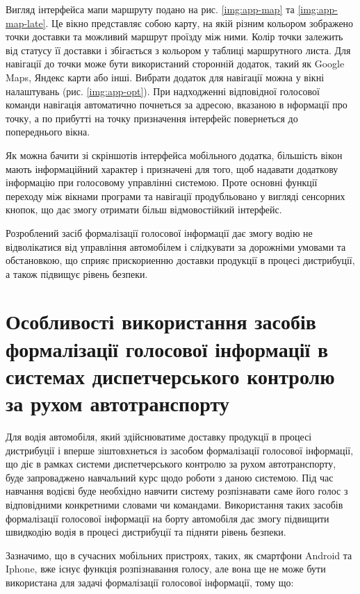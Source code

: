 Вигляд інтерфейса мапи маршруту подано на рис. \ref{img:app-map} та \ref{img:app-map-late}. Це вікно представляє собою карту, на якій різним кольором зображено точки доставки та можливий маршрут проїзду між ними. Колір точки залежить від статусу її доставки і збігається з кольором у таблиці маршрутного листа. Для навігації до точки може бути використаний сторонній додаток, такий як Google Maps, Яндекс карти або інші. Вибрати додаток для навігації можна у вікні налаштувань (рис. \ref{img:app-opt}). При надходженні відповідної голосової команди навігація автоматично почнеться за адресою, вказаною в нформації про точку, а по прибутті на точку призначення інтерфейс повернеться до попереднього вікна.

Як можна бачити зі скріншотів інтерфейса мобільного додатка, більшість вікон мають інформаційний характер і призначені для того, щоб надавати додаткову інформацію при голосовому управлінні системою. Проте основні функції переходу між вікнами програми та навігації продубльовано у вигляді сенсорних кнопок, що дає змогу отримати більш відмовостійкий інтерфейс.

Розроблений засіб формалізації голосової інформації дає змогу водію не відволікатися від управління автомобілем і слідкувати за дорожніми умовами та обстановкою, що сприяє прискориенню доставки продукції в процесі дистрибуції, а також підвищує рівень безпеки.

\section{Особливості використання засобів формалізації голосової інформації в системах диспетчерського контролю за рухом автотранспорту} \label{sect4_1}

Для водія автомобіля, який здійснюватиме доставку продукції в процесі дистрибуції і вперше зіштовхнеться із засобом формалізації голосової інформації, що діє в рамках системи диспетчерського контролю за рухом автотранспорту, буде запроваджено навчальний курс щодо роботи з даною системою. Під час навчання водієві буде необхідно навчити систему розпізнавати саме його голос з відповідними конкретними словами чи командами. Використання таких засобів формалізації голосової інформації на борту автомобіля дає змогу підвищити швидкодію водія в процесі дистрибуції та підняти рівень безпеки.

Зазначимо, що в сучасних мобільних пристроях, таких, як смартфони Android та Iphone, вже існує функція розпізнавання голосу, але вона ще не може бути використана для задачі формалізації голосової інформації, тому що:

